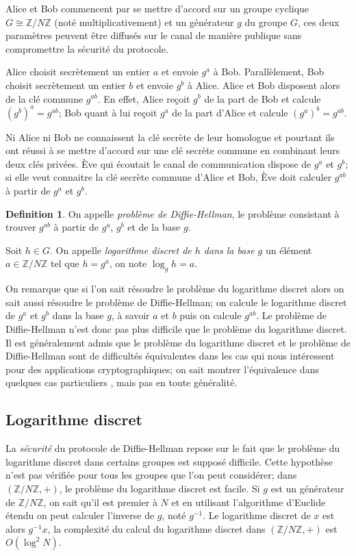 \documentclass[a4paper,12pt]{article}
\theoremstyle{definition}
\newtheorem{definition}{Definition}[section]
\theoremstyle{remark}
\numberwithin{equation}{section}
\begin{document}
Alice et Bob commencent par se mettre d'accord sur un groupe cyclique $G \cong \mathbb{Z}/N\mathbb{Z}$ (noté multiplicativement) et un générateur $g$ du groupe $G$, ces deux paramètres peuvent être diffusés sur le canal de manière publique sans compromettre la sécurité du protocole.

Alice choisit secrètement un entier $a$ et envoie $g^a$ à Bob. Parallèlement, Bob choisit secrètement un entier $b$ et envoie $g^b$ à Alice. Alice et Bob disposent alors de la clé commune $g^{ab}$. En effet, Alice reçoit $g^b$ de la part de Bob et calcule $(g^b)^a = g^{ab}$; Bob quant à lui reçoit $g^a$ de la part d'Alice et calcule $(g^a)^b = g^{ab}$.

Ni Alice ni Bob ne connaissent la clé secrète de leur homologue et pourtant ils ont réussi à se mettre d'accord sur une clé secrète commune en combinant leurs deux clés privées. Ève qui écoutait le canal de communication dispose de $g^a$ et $g^b$; si elle veut connaitre la clé secrète commune d'Alice et Bob, Ève doit calculer $g^{ab}$ à partir de $g^a$ et $g^b$.

\begin{definition}
On appelle \emph{problème de Diffie-Hellman}, le problème consistant à trouver $g^{ab}$ à partir de $g^a$, $g^b$ et de la base $g$.

Soit $h \in G$. On appelle \emph{logarithme discret de $h$ dans la base $g$} un élément $a \in \mathbb{Z}/N\mathbb{Z}$ tel que $h=g^a$, on note $\log_g h = a$.
\end{definition}

On remarque que si l'on sait résoudre le problème du logarithme discret alors on sait aussi résoudre le problème de Diffie-Hellman; on calcule le logarithme discret de $g^a$ et $g^b$ dans la base $g$, à savoir $a$ et $b$ puis on calcule $g^{ab}$. Le problème de Diffie-Hellman n'est donc pas plus difficile que le problème du logarithme discret. Il est généralement admis que le problème du logarithme discret et le problème de Diffie-Hellman sont de difficultés équivalentes dans les cas qui nous intéressent pour des applications cryptographiques; on sait montrer l'équivalence dans quelques cas particuliers \citep{maurer} \citep{muzereau},
mais pas en toute généralité.

\subsection{Logarithme discret}
La \emph{sécurité} du protocole de Diffie-Hellman repose sur le fait que le problème du logarithme discret dans certains groupes est supposé difficile. Cette hypothèse n'est pas vérifiée pour tous les groupes que l'on peut considérer; dans $(\mathbb{Z}/N\mathbb{Z},+)$, le problème du logarithme discret est facile. Si $g$ est un générateur de $\mathbb{Z}/N\mathbb{Z}$, on sait qu'il est premier à $N$ et en utilisant l'algorithme d'Euclide étendu on peut calculer l'inverse de $g$, noté $g^{-1}$. Le logarithme discret de $x$ est alors $g^{-1}x$, la complexité du calcul du logarithme discret dans $(\mathbb{Z}/N\mathbb{Z},+)$ est $O(\log^2N)$.
\end{document}
